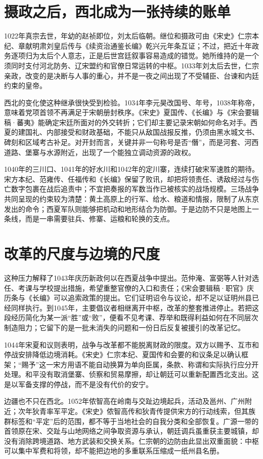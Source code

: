 \section{摄政之后，西北成为一张持续的账单}

1022年真宗去世，年幼的赵祯即位，刘太后临朝。继位和摄政可由《宋史》仁宗本纪、章献明肃刘皇后传与《续资治通鉴长编》乾兴元年条互证；不过，把近十年政务逐项归为太后个人意志，正是后世宫廷叙事容易造成的错觉。她所维持的是一个须同时支付河北防务、辽宋盟约和官僚日常运转的中枢。1033年刘太后去世，仁宗亲政，改变的是决断与人事的重心，并不是一夜之间出现了不受辅臣、台谏和内廷约束的皇帝。

西北的变化使这种继承很快受到检验。1034年李元昊改国号、年号，1038年称帝，意味着党项首领不再满足于宋朝册封秩序。《宋史》夏国传、《长编》与《宋会要辑稿·蕃夷》能确定宋廷所面对的外交转折；它们却主要记录宋朝如何命名对手。西夏的建国礼、内部接受和财政基础，不能只从敌国战报反推，仍须由黑水城文书、碑刻和区域考古补足。对开封而言，关键并非一句称号是否“僭”，而是河套、河西道路、堡寨与水源附近，出现了一个能独立调动资源的政权。

1040年的三川口、1041年的好水川和1042年的定川寨，连续打破宋军速胜的期待。宋方本纪、范雍传、任福传和《长编》保留了败讯，却把将领责任、诱敌经过与伤亡数字包裹在战后追责中；不宜把奏报的军数当作已被核实的战场规模。三场战争共同呈现的约束较为清楚：黄土高原上的行军、给水、粮道和情报，限制了从东京发出的命令；西夏军队则能够把机动和地形结合为防御。于是边防不只是地图上一条线，而是一串需要驻兵、修寨、运粮和轮换的支点。

\section{改革的尺度与边境的尺度}

这种压力解释了1043年庆历新政何以在西夏战争中提出。范仲淹、富弼等人针对选任、考课与学校提出措施，希望重整官僚的入口和责任；《宋会要辑稿·职官》庆历条与《长编》可以追索政策的提出。它们证明诏令与议论，却不足以证明州县已经同样执行。到1045年，主要倡议者相继离开中枢，改革的整套推进停止。若把这段经历简化为某一派“胜”或“败”，便看不见考课、荐举和既得利益如何在不同层次制造阻力；它留下的是一批未消失的问题和一份日后反复被援引的改革记忆。

1044年宋夏和议则表明，战争与改革都不能脱离财政的限度。双方以赐予、互市和停战安排降低边境消耗。《宋史》仁宗本纪、夏国传和会要的和议条足以确认框架；“赐予”这一宋方用语不能自动换算为单向臣属，条款、称谓和实际执行应分开处理。和平没有取消堡寨、侦察和贸易摩擦，却让朝廷可以重新配置西北支出。这是以军备支撑的停战，而不是没有代价的安宁。

边疆也不只在西北。1052年侬智高在岭南与交趾边境起兵，活动及邕州、广州附近；次年狄青率军平定。《宋史》侬智高传和狄青传提供宋方的行动线索，但其族群标签和“平定”后的范围，都不等于当地社会的自我分类和全部恢复。广源一带的首领原在宋、交趾与山地网络之间争取资源与承认，朝廷调兵虽重获主要城镇，却没有消除跨境道路、地方武装和交换关系。仁宗朝的边防由此显出双重面貌：中枢可以集中军费和将领，却不能把边地的多重联系压缩成一纸州县名册。
